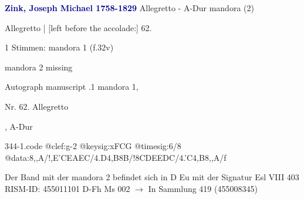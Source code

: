 \documentclass[twocolumn]{book}
\begin{document}
\newline \par \vspace{7pt} \textcolor{darkblue}{\textbf{Zink, Joseph Michael  1758-1829}}
\newline Allegretto - A-Dur
\newline mandora (2)
\newline \begin{itshape}[f.32v, at left:] Allegretto | [left before the accolade:] 62.\end{itshape} 
\newline \textcolor{darkblue}{}  1 Stimmen: mandora 1  (f.32v)
\newline \begin{small} mandora 2 missing\end{small} 
\newline Autograph manuscript
.1  mandora 1, \begin{itshape}Nr. 62. Allegretto\end{itshape}, A-Dur  
\begin{filecontents*}{344-1.code}
@clef:g-2
@keysig:xFCG
@timesig:6/8
@data:8,,A/!,E'CEAEC/4.D4,B8B/!8CDEEDC/4.'C4,B8,,A/f
\end{filecontents*}
\newline
%
\newline Der Band mit der mandora 2 befindet sich in D Eu mit der Signatur Esl VIII 403
\newline RISM-ID: 455011101
\newline D-Fh  Ms 002
\newline $\rightarrow$ In Sammlung 419 (455008345)
      
\end{document}
